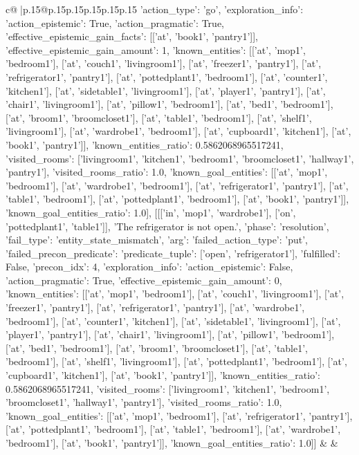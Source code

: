 \documentclass{article}
\begin{document}
{\begin{supertabular}{c@{$\;$}|p{.15\linewidth}@{}p{.15\linewidth}p{.15\linewidth}p{.15\linewidth}p{.15\linewidth}p{.15\linewidth}}
{{{{'action_type': 'go', 'exploration_info': {'action_epistemic': True, 'action_pragmatic': True, 'effective_epistemic_gain_facts': [['at', 'book1', 'pantry1']], 'effective_epistemic_gain_amount': 1, 'known_entities': [['at', 'mop1', 'bedroom1'], ['at', 'couch1', 'livingroom1'], ['at', 'freezer1', 'pantry1'], ['at', 'refrigerator1', 'pantry1'], ['at', 'pottedplant1', 'bedroom1'], ['at', 'counter1', 'kitchen1'], ['at', 'sidetable1', 'livingroom1'], ['at', 'player1', 'pantry1'], ['at', 'chair1', 'livingroom1'], ['at', 'pillow1', 'bedroom1'], ['at', 'bed1', 'bedroom1'], ['at', 'broom1', 'broomcloset1'], ['at', 'table1', 'bedroom1'], ['at', 'shelf1', 'livingroom1'], ['at', 'wardrobe1', 'bedroom1'], ['at', 'cupboard1', 'kitchen1'], ['at', 'book1', 'pantry1']], 'known_entities_ratio': 0.5862068965517241, 'visited_rooms': ['livingroom1', 'kitchen1', 'bedroom1', 'broomcloset1', 'hallway1', 'pantry1'], 'visited_rooms_ratio': 1.0, 'known_goal_entities': [['at', 'mop1', 'bedroom1'], ['at', 'wardrobe1', 'bedroom1'], ['at', 'refrigerator1', 'pantry1'], ['at', 'table1', 'bedroom1'], ['at', 'pottedplant1', 'bedroom1'], ['at', 'book1', 'pantry1']], 'known_goal_entities_ratio': 1.0}}], [[['in', 'mop1', 'wardrobe1'], ['on', 'pottedplant1', 'table1']], 'The refrigerator is not open.', {'phase': 'resolution', 'fail_type': 'entity_state_mismatch', 'arg': {'failed_action_type': 'put', 'failed_precon_predicate': {'predicate_tuple': ['open', 'refrigerator1'], 'fulfilled': False, 'precon_idx': 4}}, 'exploration_info': {'action_epistemic': False, 'action_pragmatic': True, 'effective_epistemic_gain_amount': 0, 'known_entities': [['at', 'mop1', 'bedroom1'], ['at', 'couch1', 'livingroom1'], ['at', 'freezer1', 'pantry1'], ['at', 'refrigerator1', 'pantry1'], ['at', 'wardrobe1', 'bedroom1'], ['at', 'counter1', 'kitchen1'], ['at', 'sidetable1', 'livingroom1'], ['at', 'player1', 'pantry1'], ['at', 'chair1', 'livingroom1'], ['at', 'pillow1', 'bedroom1'], ['at', 'bed1', 'bedroom1'], ['at', 'broom1', 'broomcloset1'], ['at', 'table1', 'bedroom1'], ['at', 'shelf1', 'livingroom1'], ['at', 'pottedplant1', 'bedroom1'], ['at', 'cupboard1', 'kitchen1'], ['at', 'book1', 'pantry1']], 'known_entities_ratio': 0.5862068965517241, 'visited_rooms': ['livingroom1', 'kitchen1', 'bedroom1', 'broomcloset1', 'hallway1', 'pantry1'], 'visited_rooms_ratio': 1.0, 'known_goal_entities': [['at', 'mop1', 'bedroom1'], ['at', 'refrigerator1', 'pantry1'], ['at', 'pottedplant1', 'bedroom1'], ['at', 'table1', 'bedroom1'], ['at', 'wardrobe1', 'bedroom1'], ['at', 'book1', 'pantry1']], 'known_goal_entities_ratio': 1.0}}]] 
	  } 
	   } 
	   } 
	 & & \\ 
 


\end{supertabular}}
\end{document}
